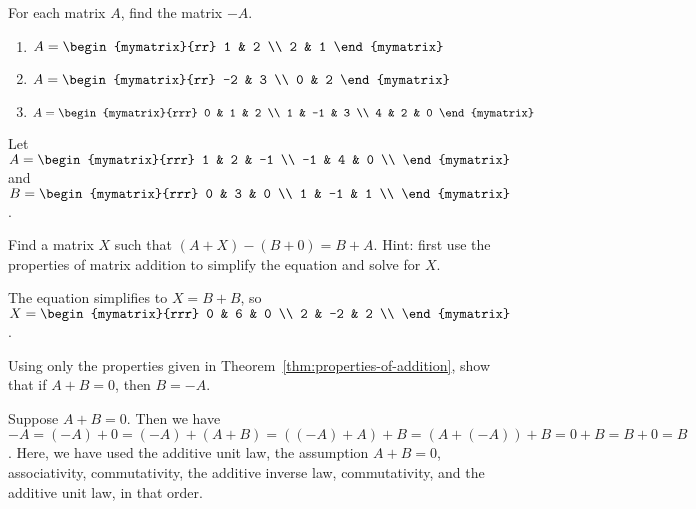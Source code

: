 \begin{ex}
  For each matrix $A$, find the matrix $-A$.
  \begin{enumerate}
  \item
    $A = \begin{mymatrix}{rr}
      1 & 2 \\
      2 & 1
    \end{mymatrix}$

  \item
    $A = \begin{mymatrix}{rr}
      -2 & 3 \\
      0 & 2
    \end{mymatrix}$

  \item
    $A = \begin{mymatrix}{rrr}
      0 & 1 & 2 \\
      1 & -1 & 3 \\
      4 & 2 & 0
    \end{mymatrix}$
  \end{enumerate}
\end{ex}

\begin{ex}
  Let $A = \begin{mymatrix}{rrr}
    1 & 2 & -1 \\
    -1 & 4 & 0 \\
  \end{mymatrix}$ and
  $B = \begin{mymatrix}{rrr}
    0 & 3 & 0 \\
    1 & -1 & 1 \\
  \end{mymatrix}$.\par\noindent
  Find a matrix $X$ such that $(A+X)-(B+0) = B+A$. Hint: first use
  the properties of matrix addition to simplify the equation and
  solve for $X$.
  \begin{sol}
    The equation simplifies to $X=B+B$, so $X = \begin{mymatrix}{rrr}
    0 & 6 & 0 \\
    2 & -2 & 2 \\
    \end{mymatrix}$.
  \end{sol}
\end{ex}

\begin{ex}\label{add-inv-rst-unique}
  Using only the properties given in
  Theorem~\ref{thm:properties-of-addition}, show that if $A+B=0$, then
  $B=-A$.
  \begin{sol}
    Suppose $A+B=0$. Then we have
    $-A = (-A)+0 = (-A)+(A+B) = ((-A)+A)+B = (A+(-A))+B = 0+B = B+0 =
    B$.  Here, we have used the additive unit law, the assumption
    $A+B=0$, associativity, commutativity, the additive inverse law,
    commutativity, and the additive unit law, in that order.
  \end{sol}
\end{ex}

